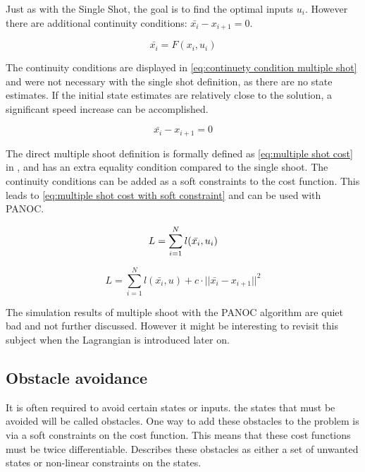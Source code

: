 			Just as with the Single Shot, the goal is to find the optimal inputs $u_i$. However there are additional continuity conditions: $\bar{x_i} - x_{i+1} = 0$.
			
			\begin{equation}
				\bar{x_i} = F(x_i,u_i)
				\label{eq:}
			\end{equation}
			
			The continuity conditions are displayed in \eqref{eq:continuety condition multiple shot} and were not necessary with the single shot definition, as there are no state estimates. If the initial state estimates are relatively close to the solution, a significant speed increase can be accomplished.
			
			\begin{equation}
				\bar{x_i} - x_{i+1} = 0
				\label{eq:continuety condition multiple shot}
			\end{equation}
			
			The direct multiple shoot definition is formally defined as \eqref{eq:multiple shot cost} in \cite{Diehl2005}, and has an extra equality condition compared to the single shoot. The continuity conditions can be added as a soft constraints to the cost function. This leads to \eqref{eq:multiple shot cost with soft constraint} and can be used with PANOC.
			
			\begin{equation}
				L = \sum_{i=1}^{N} l(\bar{x_i},u_i) \\
				\label{eq:multiple shot cost}
			\end{equation}
			
			\begin{equation}
			L =  \sum_{i=1}^{N} l(\bar{x_i},u) + c \cdot ||\bar{x_i} - x_{i+1}||^2
			\label{eq:multiple shot cost with soft constraint}
			\end{equation}
			
			The simulation results of multiple shoot with the PANOC algorithm are quiet bad and not further discussed. However it might be interesting to revisit this subject when the Lagrangian is introduced later on.
		\subsection{Obstacle avoidance}
			It is often required to avoid certain states or inputs. the states that must be avoided will be called obstacles. One way to add these obstacles to the problem is via a soft constraints on the cost function. This means that these cost functions must be twice differentiable.\cite{AjaySathya2017} Describes these obstacles as either a set of unwanted states or non-linear constraints on the states.
			
